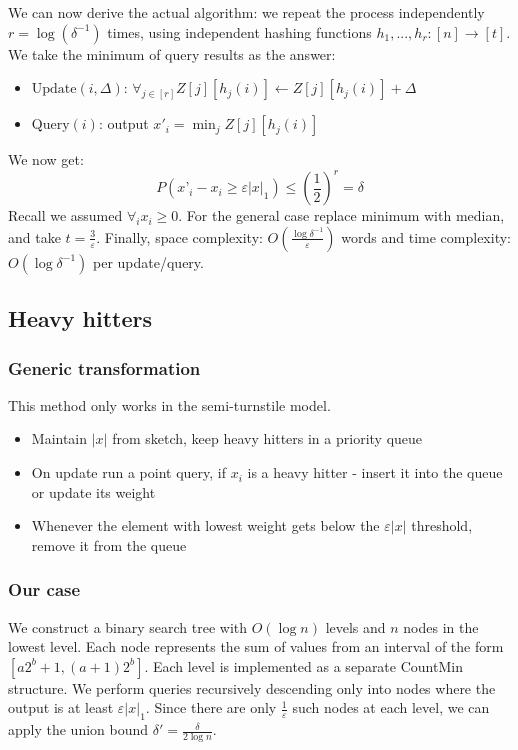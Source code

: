\documentclass[11pt]{article}
\begin{document}
We can now derive the actual algorithm: we repeat the process independently $r = \log(\delta^{-1})$ times, using independent hashing functions $h_1, ..., h_r:[n]\rightarrow[t]$. We take the minimum of query results as the answer:
\begin{itemize}
\item $\text{Update}(i, \Delta)$: $\forall_{j \in [r]} Z[j][h_j(i)] \leftarrow Z[j][h_j(i)] + \Delta$
\item $\text{Query}(i)$: output $x'_i = \min_j Z[j][h_j(i)]$
\end{itemize}
We now get: $$P(x’_i - x_i \ge \varepsilon|x|_1) \le \left(\frac{1}{2}\right)^r = \delta$$
Recall we assumed $\forall_i x_i \ge 0$. For the general case replace minimum with median, and take $t = \frac{3}{\varepsilon}$. Finally, space complexity: $O\left(\frac{\log \delta^{-1}}{\varepsilon}\right)$ words  and time complexity: $O(\log \delta^{-1})$ per update/query.
\subsection{Heavy hitters}
\subsubsection{Generic transformation}
This method only works in the semi-turnstile model.
\begin{itemize}
\item Maintain $|x|$ from sketch, keep heavy hitters in a priority queue
\item On update run a point query, if $x_i$ is a heavy hitter - insert it into the queue or update its weight
\item Whenever the element with lowest weight gets below the $\varepsilon|x|$ threshold, remove it from the queue
\end{itemize}
\subsubsection{Our case}
We construct a binary search tree with $O(\log n)$ levels and $n$ nodes in the lowest level. Each node represents the sum of values from an interval of the form $[a2^b+1, (a+1)2^b]$. Each level is implemented as a separate CountMin structure. We perform queries recursively descending only into nodes where the output is at least $\varepsilon|x|_1$. Since there are only $\frac{1}{\varepsilon}$ such nodes at each level, we can apply the union bound $\delta' = \frac{\delta}{2\log n}$.
\end{document}
